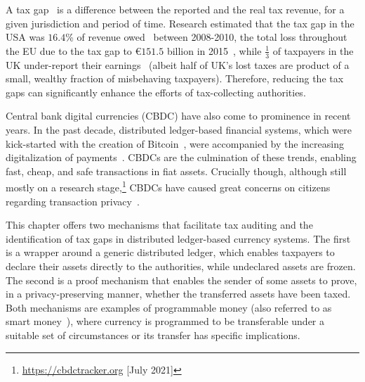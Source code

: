 A tax gap~\cite{comission2018taxgaps} is a difference between the reported and
the real tax revenue, for a given jurisdiction and period of time. Research
estimated that the tax gap in the USA was $16.4$\% of revenue
owed~\cite{internal2016federal} between 2008-2010, the total loss throughout
the EU due to the tax gap to €$151.5$ billion in 2015~\cite{murphy2018resources}, while
$\frac{1}{3}$ of taxpayers in the UK under-report their
earnings~\cite{advani2020does} (albeit half of UK's lost taxes are product of a
small, wealthy fraction of misbehaving taxpayers). Therefore, reducing the tax
gaps can significantly enhance the efforts of tax-collecting authorities.

Central bank digital currencies (CBDC) have also come to prominence in recent
years. In the past decade, distributed ledger-based financial systems, which
were kick-started with the creation of Bitcoin~\cite{nakamoto2008bitcoin}, were
accompanied by the increasing digitalization of payments~\cite{bis2011digital}.
CBDCs are the culmination of these trends, enabling fast, cheap, and safe
transactions in fiat assets. Crucially though, although still mostly on a
research stage,\footnote{\url{https://cbdctracker.org} [July 2021]} CBDCs have
caused great concerns on citizens regarding transaction
privacy~\cite{ecb2021cbdcprivacy}.

This chapter offers two mechanisms that facilitate tax auditing and the
identification of tax gaps in distributed ledger-based currency systems. The
first is a wrapper around a generic distributed ledger, which enables taxpayers
to declare their assets directly to the authorities, while undeclared assets
are frozen. The second is a proof mechanism that enables the sender of some
assets to prove, in a privacy-preserving manner, whether the transferred assets
have been taxed. Both mechanisms are examples of programmable money (also
referred to as smart money~\cite{AHA}), where currency is programmed to be
transferable under a suitable set of  circumstances or its transfer has
specific implications.
